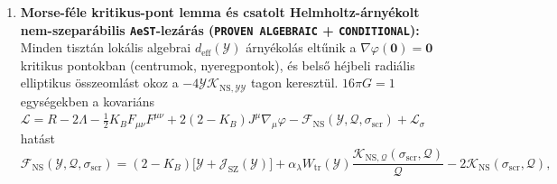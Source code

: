 \documentclass[11pt,a4paper]{article}
\begin{document}
{\begin{enumerate}\setlength{\itemsep}{2pt}
\item \textbf{Morse-féle kritikus-pont lemma és csatolt Helmholtz-árnyékolt nem-szeparábilis \texttt{AeST}-lezárás (\texttt{PROVEN ALGEBRAIC} + \texttt{CONDITIONAL}):} Minden tisztán lokális algebrai $d_{\mathrm{eff}}(\mathcal{Y})$ árnyékolás eltűnik a $\nabla\varphi(\mathbf{0})=\mathbf{0}$ kritikus pontokban (centrumok, nyeregpontok), és belső héjbeli radiális elliptikus összeomlást okoz a $-4\mathcal{Y}\mathcal{K}_{\mathrm{NS},\mathcal{Y}\mathcal{Y}}$ tagon keresztül. $16\pi G=1$ egységekben a kovariáns $\mathcal{L} = R - 2\Lambda - \frac{1}{2}K_B F_{\mu\nu}F^{\mu\nu} + 2(2-K_B)J^\mu\nabla_\mu\varphi - \mathcal{F}_{\mathrm{NS}}(\mathcal{Y},\mathcal{Q},\sigma_{\mathrm{scr}}) + \mathcal{L}_\sigma$ hatást
\[
\mathcal{F}_{\mathrm{NS}}(\mathcal{Y},\mathcal{Q},\sigma_{\mathrm{scr}}) = (2-K_B)\bigl[\mathcal{Y}+\mathcal{J}_{\mathrm{SZ}}(\mathcal{Y})\bigr] + \alpha_\lambda W_{\mathrm{tr}}(\mathcal{Y})\frac{\mathcal{K}_{\mathrm{NS},\mathcal{Q}}(\sigma_{\mathrm{scr}},\mathcal{Q})}{\mathcal{Q}} - 2\mathcal{K}_{\mathrm{NS}}(\sigma_{\mathrm{scr}},\mathcal{Q}),
\]

\end{enumerate}}
\end{document}
